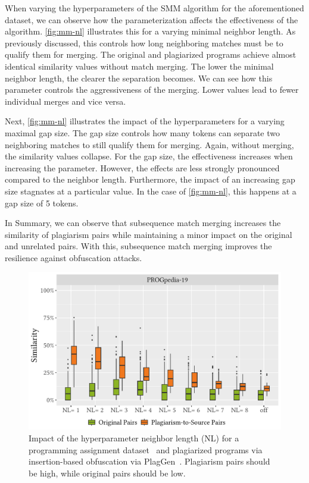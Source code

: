 
When varying the hyperparameters of the SMM algorithm for the aforementioned dataset, we can observe how the parameterization affects the effectiveness of the algorithm.
\autoref{fig:mm-nl} illustrates this for a varying minimal neighbor length. As previously discussed, this controls how long neighboring matches must be to qualify them for merging. The original and plagiarized programs achieve almost identical similarity values without match merging. The lower the minimal neighbor length, the clearer the separation becomes. We can see how this parameter controls the aggressiveness of the merging. Lower values lead to fewer individual merges and vice versa.

Next, \autoref{fig:mm-nl} illustrates the impact of the hyperparameters for a varying maximal gap size. The gap size controls how many tokens can separate two neighboring matches to still qualify them for merging. Again, without merging, the similarity values collapse. For the gap size, the effectiveness increases when increasing the parameter. However, the effects are less strongly pronounced compared to the neighbor length. Furthermore, the impact of an increasing gap size stagnates at a particular value. In the case of \autoref{fig:mm-nl}, this happens at a gap size of 5 tokens.

In Summary, we can observe that subsequence match merging increases the similarity of plagiarism pairs while maintaining a minor impact on the original and unrelated pairs. With this, subsequence match merging improves the resilience against obfuscation attacks.


\begin{figure}[p]
\centering
\includegraphics[width=0.95\linewidth]{figures/algorithm/eval-mm-NL_avg.similarity.pdf}
\caption[Impact of the Neighbor Length]{Impact of the hyperparameter neighbor length (NL) for a programming assignment dataset~\cite{paiva2023} and plagiarized programs via insertion-based obfuscation via PlagGen~\cite{Broedel2023}. Plagiarism pairs should be high, while original pairs should be low.}
\label{fig:mm-nl}
\end{figure}

